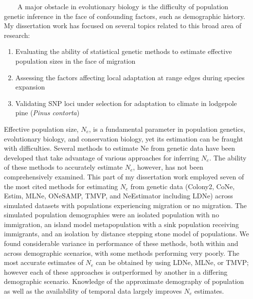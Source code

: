 \renewcommand{\thepage}{Dissertation Summary}


~~~~A major obstacle in evolutionary biology is the difficulty of population genetic inference in the face of confounding factors, such as demographic history. My dissertation work has focused on several topics related to this broad area of research:
\begin{enumerate}[nolistsep]
\item Evaluating the ability of statistical genetic methods to estimate effective population sizes in the face of migration \citep{Gilbert:2015io}
\item Assessing the factors affecting local adaptation at range edges during species expansion
\item Validating SNP loci under selection for adaptation to climate in lodgepole pine (\emph{Pinus contorta})
\end{enumerate}

	Effective population size, $N_e$, is a fundamental parameter in population genetics, evolutionary biology, and conservation biology, yet its estimation can be fraught with difficulties. Several methods to estimate Ne from genetic data have been developed that take advantage of various approaches for inferring $N_e$. The ability of these methods to accurately estimate $N_e$, however, has not been comprehensively examined. This part of my dissertation work employed seven of the most cited methods for estimating $N_e$ from genetic data (Colony2, CoNe, Estim, MLNe, ONeSAMP, TMVP, and NeEstimator including LDNe) across simulated datasets with populations experiencing migration or no migration. The simulated population demographies were an isolated population with no immigration, an island model metapopulation with a sink population receiving immigrants, and an isolation by distance stepping stone model of populations. We found considerable variance in performance of these methods, both within and across demographic scenarios, with some methods performing very poorly. The most accurate estimates of $N_e$ can be obtained by using LDNe, MLNe, or TMVP; however each of these approaches is outperformed by another in a differing demographic scenario. Knowledge of the approximate demography of population as well as the availability of temporal data largely improves $N_e$ estimates.
	
